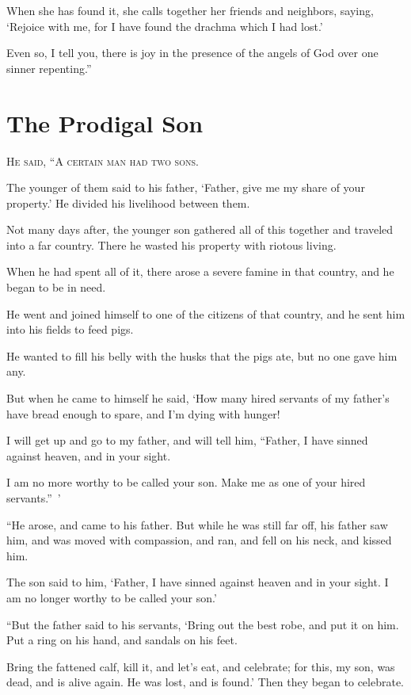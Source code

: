 When she has found it, she calls together her friends and neighbors, saying, ‘Rejoice with me, for I have found the drachma which I had lost.’

Even so, I tell you, there is joy in the presence of the angels of God over one sinner repenting.”


\clearpage \section*{The Prodigal Son}

\lettrine{H}{e said, “A certain man had two sons.}

The younger of them said to his father, ‘Father, give me my share of your property.’ He divided his livelihood between them.

Not many days after, the younger son gathered all of this together and traveled into a far country. There he wasted his property with riotous living.

When he had spent all of it, there arose a severe famine in that country, and he began to be in need.

He went and joined himself to one of the citizens of that country, and he sent him into his fields to feed pigs.

He wanted to fill his belly with the husks that the pigs ate, but no one gave him any.

But when he came to himself he said, ‘How many hired servants of my father’s have bread enough to spare, and I’m dying with hunger!

I will get up and go to my father, and will tell him, “Father, I have sinned against heaven, and in your sight.

I am no more worthy to be called your son. Make me as one of your hired servants.” ’

“He arose, and came to his father. But while he was still far off, his father saw him, and was moved with compassion, and ran, and fell on his neck, and kissed him.

The son said to him, ‘Father, I have sinned against heaven and in your sight. I am no longer worthy to be called your son.’

“But the father said to his servants, ‘Bring out the best robe, and put it on him. Put a ring on his hand, and sandals on his feet.

Bring the fattened calf, kill it, and let’s eat, and celebrate; for this, my son, was dead, and is alive again. He was lost, and is found.’ Then they began to celebrate.


